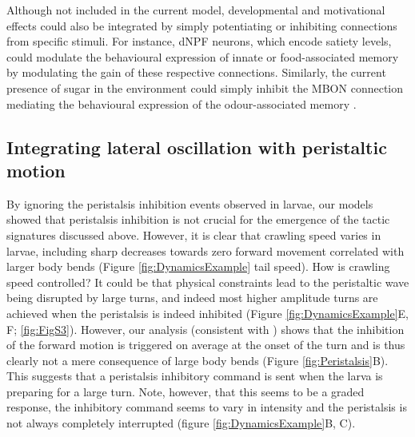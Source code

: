 \documentclass[11pt,a4paper]{article}
\newcommand{\todoBW}[1]{\todo[author=BW,color=orange, size=\tiny,inline]{#1}}
\begin{document}
Although not included in the current model, developmental \citep{gong2010two,wu2003developmental} and motivational \citep{krashes2009neural} %
 effects could also be integrated by simply potentiating or inhibiting connections from specific stimuli. For instance, dNPF neurons, which encode satiety levels, could modulate the behavioural expression of innate or food-associated memory \citep{krashes2009neural}  by modulating the gain of these respective connections. Similarly, the current presence of sugar in the environment could simply inhibit the MBON connection mediating the behavioural expression of the odour-associated memory \citep{schleyer2011behavior}.

\subsection{Integrating lateral oscillation with peristaltic motion}
By ignoring the peristalsis inhibition events observed in larvae, our models showed that peristalsis inhibition is not crucial for the emergence of the tactic signatures discussed above. However, it is clear that crawling speed varies in larvae, including sharp decreases towards zero forward movement correlated with larger body bends (Figure \ref{fig:DynamicsExample} tail speed). How is crawling speed controlled? It could be that physical constraints lead to the peristaltic wave being disrupted by large turns, and indeed most higher amplitude turns are achieved when the peristalsis is indeed inhibited (Figure \ref{fig:DynamicsExample}E, F; \ref{fig:FigS3}). However, our analysis (consistent with \citet{hernandez2015reverse}) shows that the inhibition of the forward motion is triggered on average at the onset of the turn and is thus clearly not a mere consequence of large body bends (Figure \ref{fig:Peristalsis}B). This suggests that a peristalsis inhibitory command is sent when the larva is preparing for a large turn. Note, however, that this seems to be a graded response, the inhibitory command seems to vary in intensity and the peristalsis is not always completely interrupted (figure \ref{fig:DynamicsExample}B, C).
\end{document}
